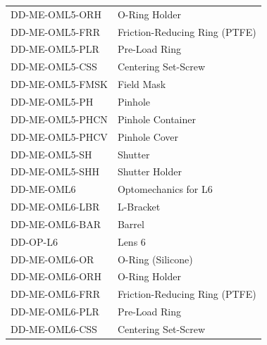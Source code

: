 \documentclass{report}
\begin{document}
\begin{table}
\begin{center}
\begin{tabular}{ll}
DD-ME-OML5-ORH	&	O-Ring Holder	\\
DD-ME-OML5-FRR	&	Friction-Reducing Ring (PTFE)	\\
DD-ME-OML5-PLR	&	Pre-Load Ring	\\
DD-ME-OML5-CSS	&	Centering Set-Screw	\\
DD-ME-OML5-FMSK	&	Field Mask	\\
DD-ME-OML5-PH	&	Pinhole	\\
DD-ME-OML5-PHCN	&	Pinhole Container	\\
DD-ME-OML5-PHCV	&	Pinhole Cover	\\
DD-ME-OML5-SH	&	Shutter	\\
DD-ME-OML5-SHH	&	Shutter Holder	\\
\hline
DD-ME-OML6	&	Optomechanics for L6	\\
DD-ME-OML6-LBR	&	L-Bracket	\\
DD-ME-OML6-BAR	&	Barrel	\\
DD-OP-L6	&	Lens 6	\\
DD-ME-OML6-OR	&	O-Ring (Silicone)	\\
DD-ME-OML6-ORH	&	O-Ring Holder	\\
DD-ME-OML6-FRR	&	Friction-Reducing Ring (PTFE)	\\
DD-ME-OML6-PLR	&	Pre-Load Ring	\\
DD-ME-OML6-CSS	&	Centering Set-Screw	\\
\hline
\end{tabular}
\end{center}
\end{table}
\end{document}
